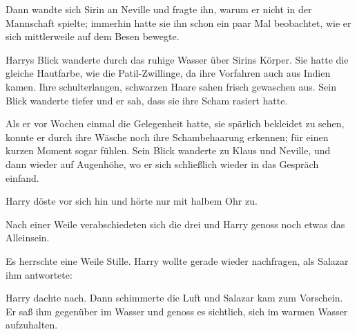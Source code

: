 Dann wandte sich Sirin an Neville und fragte ihn, warum er nicht in der Mannschaft spielte; immerhin hatte sie ihn schon ein paar Mal beobachtet, wie er sich mittlerweile auf dem Besen bewegte.

\begin{abAchtzehn}
Harrys Blick wanderte durch das ruhige Wasser über Sirins Körper. Sie hatte die gleiche Hautfarbe, wie die Patil-Zwillinge, da ihre Vorfahren auch aus Indien kamen. Ihre schulterlangen, schwarzen Haare sahen frisch gewaschen aus. Sein Blick wanderte tiefer und er sah, dass sie ihre Scham rasiert hatte.

Als er vor Wochen einmal die Gelegenheit hatte, sie spärlich bekleidet zu sehen, konnte er durch ihre Wäsche noch ihre Schambehaarung erkennen; für einen kurzen Moment sogar fühlen. Sein Blick wanderte zu Klaus und Neville, und dann wieder auf Augenhöhe, wo er sich schließlich wieder in das Gespräch einfand.
\end{abAchtzehn}

\begin{safedivide}
Harry döste vor sich hin und hörte nur mit halbem Ohr zu.
\end{safedivide}

Nach einer Weile verabschiedeten sich die drei und Harry genoss noch etwas das Alleinsein.








Es herrschte eine Weile Stille. Harry wollte gerade wieder nachfragen, als Salazar ihm antwortete: 

Harry dachte nach. Dann schimmerte die Luft und Salazar kam zum Vorschein. Er saß ihm gegenüber im Wasser und genoss es sichtlich, sich im warmen Wasser aufzuhalten.

